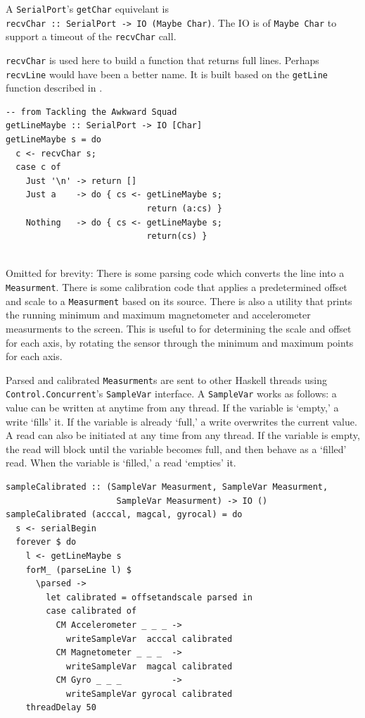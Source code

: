 \documentclass[12pt]{report}
\begin{document}
A \lstinline$SerialPort$'s \lstinline$getChar$ equivelant is \\\lstinline$recvChar :: SerialPort -> IO (Maybe Char)$. The IO is of \lstinline$Maybe Char$ to support a timeout of the \lstinline$recvChar$ call. 

\lstinline$recvChar$ is used here to build a function that returns full lines. Perhaps \lstinline$recvLine$ would have been a better name. It is built based on the \lstinline$getLine$ function described in \cite{spjones00}.

\begin{lstlisting}
-- from Tackling the Awkward Squad 
getLineMaybe :: SerialPort -> IO [Char] 
getLineMaybe s = do 
  c <- recvChar s;
  case c of
    Just '\n' -> return []
    Just a    -> do { cs <- getLineMaybe s;
                            return (a:cs) }
    Nothing   -> do { cs <- getLineMaybe s;
                            return(cs) }
       
\end{lstlisting}
Omitted for brevity:
There is some parsing code which converts the line into a \lstinline$Measurment$. 
There is some calibration code that applies a predetermined offset and scale to a \lstinline$Measurment$ based on its source.
There is also a utility that prints the running minimum and maximum magnetometer and accelerometer measurments to the screen. This is useful to for determining the scale and offset for each axis, by rotating the sensor through the minimum and maximum points for each axis. 

Parsed and calibrated \lstinline$Measurment$s are sent to other Haskell threads using \lstinline$Control.Concurrent$'s \lstinline$SampleVar$ interface. A \lstinline$SampleVar$ works as follows: a value can be written at anytime from any thread. If the variable is `empty,' a write `fills' it. If the variable is already `full,' a write overwrites the current value. A read can also be initiated at any time from any thread. If the variable is empty, the read will block until the variable becomes full, and then behave as a `filled' read. When the variable is `filled,' a read `empties' it. 

\begin{lstlisting}
sampleCalibrated :: (SampleVar Measurment, SampleVar Measurment, 
                      SampleVar Measurment) -> IO ()
sampleCalibrated (acccal, magcal, gyrocal) = do
  s <- serialBegin
  forever $ do
    l <- getLineMaybe s
    forM_ (parseLine l) $
      \parsed -> 
        let calibrated = offsetandscale parsed in
        case calibrated of 
          CM Accelerometer _ _ _ ->  
            writeSampleVar  acccal calibrated
          CM Magnetometer _ _ _  ->  
            writeSampleVar  magcal calibrated
          CM Gyro _ _ _          ->  
            writeSampleVar gyrocal calibrated
    threadDelay 50
\end{lstlisting}
\end{document}
